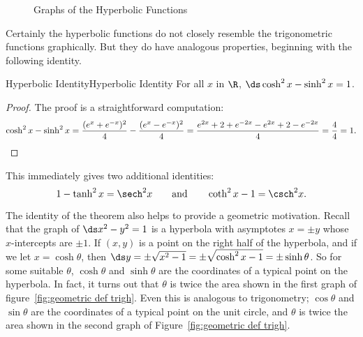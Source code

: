 \begin{figure}
\begin{subfigure}{.5\textwidth}
\end{subfigure} 
\caption{Graphs of the Hyperbolic Functions\label{fig:hyperbolic}}
\end{figure}





Certainly the hyperbolic functions do not closely resemble the
trigonometric functions graphically. But they do have analogous
properties, beginning with the following identity.

\begin{theorem}{Hyperbolic Identity}{Hyperbolic Identity}
\label{hyp identity}
For all $x$ in $\R$, $\ds \cosh ^2 x -\sinh ^2 x = 1$.
\end{theorem}


\begin{proof}
The proof is a straightforward computation:
$$\cosh ^2 x -\sinh ^2 x =
 {(e^x +e^{-x} )^2\over 4} -{(e^x -e^{-x} )^2\over 4}=
 {e^{2x} + 2 + e^{-2x } - e^{2x } + 2 - e^{-2x}\over 4}=
 {4\over 4} = 1.
$$
\end{proof}

This immediately gives two additional identities:
$$1-\tanh^2 x =\sech^2 x\qquad\hbox{and}\qquad
\coth^2 x - 1  =\csch^2 x.$$

The identity of the theorem also helps to provide a geometric
motivation. Recall that the graph of $\ds x^2 -y^2 =1$ is a hyperbola
with asymptotes $x=\pm y$ whose $x$-intercepts are $\pm 1$. If
$(x,y)$ is a point on the right half of the hyperbola, and if
we let $x=\cosh \theta$, then
$\ds y=\pm\sqrt{x^2-1}=\pm\sqrt{\cosh^2x-1}=\pm\sinh \theta$. So for some
suitable $\theta$, $\cosh \theta$ and $\sinh \theta$ are the coordinates of a typical
point on the hyperbola. In fact, it turns out that $\theta$ is twice the
area shown in the first graph of  figure~\ref{fig:geometric def trigh}.  Even
this is analogous to trigonometry; $\cos \theta$ and $\sin \theta$ are the
coordinates of a typical point on the unit circle, and $\theta$ is twice
the area shown in the second graph of Figure~\ref{fig:geometric def
trigh}. 


